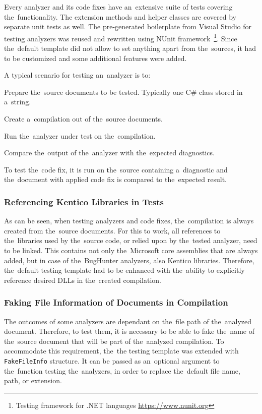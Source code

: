 \documentclass[
  digital, %
  table,   %
  lof,     %
  lot,     %
  oneside,
]{fithesis3}
\begin{document}
Every analyzer and its code fixes have an~extensive suite of tests covering the~functionality. The extension methods and helper classes are covered by separate unit tests as well. The pre-generated boilerplate from Visual Studio for testing analyzers was reused and rewritten using NUnit framework~\footnote{Testing framework for .NET languages \url{https://www.nunit.org}}. Since the~default template did not allow to set anything apart from the~sources, it had to be customized and some additional features were added.

A typical scenario for testing an~analyzer is to:
\begin{compactenum}
  \item Prepare the~source documents to be tested. Typically one C\# class stored in a~string.
  \item Create a~compilation out of the~source documents.
  \item Run the~analyzer under test on the~compilation.
  \item Compare the~output of the~analyzer with the~expected diagnostics.
\end{compactenum}

To test the~code fix, it is run on the~source containing a~diagnostic and the~document with applied code fix is compared to the~expected result.

\subsubsection{\textbf{Referencing Kentico Libraries in Tests}}
As can be seen, when testing analyzers and code fixes, the~compilation is always created from the~source documents. For this to work, all references to the~libraries used by the~source code, or relied upon by the~tested analyzer, need to be linked. This contains not only the~Microsoft core assemblies that are always added, but in case of the~BugHunter analyzers, also Kentico libraries. Therefore, the~default testing template had to be enhanced with the~ability to explicitly reference desired DLLs in the~created compilation.

\subsubsection{\textbf{Faking File Information of Documents in Compilation}}
The outcomes of some analyzers are dependant on the~file path of the~analyzed document. Therefore, to test them, it is necessary to be able to fake the~name of the~source document that will be part of the~analyzed compilation. To accommodate this requirement, the~the testing template was extended with \texttt{FakeFileInfo} structure. It can be passed as an~optional argument to the~function testing the~analyzers, in order to replace the~default file name, path, or extension.
\end{document}

